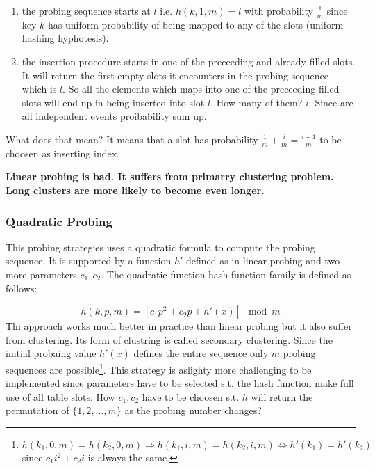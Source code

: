 \begin{enumerate}[font={\color{red!50!black}\bfseries}]
\item the probing sequence starts at $l$ i.e. $h(k,1,m) = l$ with probability $\frac{1}{m}$ since key $k$ has uniform probability of being mapped to any of the slots (uniform hashing hyphotesis).
\item the insertion procedure starts in one of the preceeding and already filled slots. It will return the first empty slots it encounters in the probing sequence which is $l$. So all the elements which maps into one of the preceeding filled slots will end up in being inserted into slot $l$. How many of them? $i$. Since are all independent events proibability sum up. 

\end{enumerate}
What does that mean?  It means that a slot has probability $\frac{1}{m} + \frac{i}{m} = \frac{i+1}{m}$ to be choosen as inserting index. 
\begin{remark}\textbf{Linear probing is bad.
It suffers from primarry clustering problem. Long clusters are more likely to become even longer.}
\end{remark}

\subsubsection{Quadratic Probing}
This probing strategies uses a quadratic formula to compute the probing sequence. It is supported by a function $h'$ defined as in linear probing and two more parameters $c_1,c_2$.
The quadratic function hash function family is defined as follows:

\[
h(k,p,m) = [c_1p^2 + c_2p + h'(x)] \mod m
\]
Thi approach works much better in practice than linear probing but it also suffer from clustering. Its form of clustring is called secondary clustering. Since the initial probaing value $h'(x)$ defines the entire sequence only $m$ probing sequences are possible\footnote{$h(k_1,0,m) = h(k_2,0,m) \Longrightarrow h(k_1,i,m) = h(k_2,i,m) \Longleftrightarrow h'(k_1) = h'(k_2)$ since $c_1i^2 + c_2i$ is always the same.}. 
This strategy is aslighty more challenging to be implemented since parameters have to be selected s.t. the hash function make full use of all table slots. 
How $c_1,c_2$  have to be choosen s.t. $h$ will return the permutation of $\{1,2,\ldots,m\}$ as the probing number changes?


